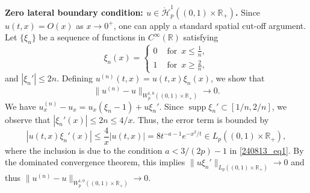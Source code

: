 \documentclass[reqno]{amsart}
\numberwithin{equation}{section}
\theoremstyle{plain}
\theoremstyle{definition}
\def\bR{\mathbb{R}}
\def\cH{\mathcal{H}}
\begin{document}
\bigskip
\noindent
\textbf{Zero lateral boundary condition: $u \in \mathring{\cH}_p^1((0, 1) \times \bR_+)$.}
Since $u(t,x)=O(x)$ as $x\to 0^+$, one can apply a standard spatial cut-off argument.
Let $\{ \xi_n \} $ be a sequence of functions in $C^\infty(\bR)$ satisfying
$$
\xi_n(x) =
\begin{cases}
    0 & \text{ for } \, x \le \frac{1}{n} , \\[4pt]
    1 & \text{ for } \, x \ge \frac{2}{n},
\end{cases}
$$
and $|\xi_n'| \le 2n$.
Defining $u^{(n)}(t,x) = u(t,x)\xi_n(x)$, we show that
\[
\|u^{(n)} - u\|_{W^{1,0}_p((0,1)\times \bR_+)} \to 0.
\]
We have $u^{(n)}_x - u_x = u_x(\xi_n - 1) + u\xi_n'$.
Since $\operatorname{supp} \xi_n' \subset [1/n, 2/n]$, we observe that $|\xi_n'(x)| \le 2n \le 4/x$.
Thus, the error term is bounded by
$$
|u(t,x)\xi_n'(x)| \le \frac{4}{x}|u(t,x)| = 8t^{-a-1}e^{-x^2/t} \in L_p((0,1)\times \bR_+),
$$
where the inclusion is due to the condition $a <  3/(2p) - 1$ in \eqref{240813_eq1}.
By the dominated convergence theorem, this implies $\|u\xi_n'\|_{L_p ( (0, 1) \times \bR_+) } \to 0$ and thus $\|u^{(n)} - u\|_{W^{1,0}_p( (0, 1) \times \bR_+)} \to 0$.
\end{document}
